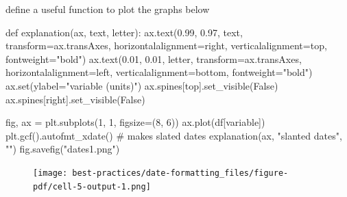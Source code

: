 \documentclass[
  letterpaper,
  DIV=11,
  numbers=noendperiod,
  oneside]{scrreprt}
\newenvironment{Shaded}{\begin{snugshade}}{\end{snugshade}}
\newcommand{\BuiltInTok}[1]{\textcolor[rgb]{0.00,0.23,0.31}{#1}}
\newcommand{\CommentTok}[1]{\textcolor[rgb]{0.37,0.37,0.37}{#1}}
\newcommand{\DecValTok}[1]{\textcolor[rgb]{0.68,0.00,0.00}{#1}}
\newcommand{\FloatTok}[1]{\textcolor[rgb]{0.68,0.00,0.00}{#1}}
\newcommand{\KeywordTok}[1]{\textcolor[rgb]{0.00,0.23,0.31}{#1}}
\newcommand{\NormalTok}[1]{\textcolor[rgb]{0.00,0.23,0.31}{#1}}
\newcommand{\OperatorTok}[1]{\textcolor[rgb]{0.37,0.37,0.37}{#1}}
\newcommand{\StringTok}[1]{\textcolor[rgb]{0.13,0.47,0.30}{#1}}
\newcommand{\VariableTok}[1]{\textcolor[rgb]{0.07,0.07,0.07}{#1}}
\begin{document}
define a useful function to plot the graphs below

\begin{Shaded}
\begin{Highlighting}[]
\KeywordTok{def}\NormalTok{ explanation(ax, text, letter):}
\NormalTok{    ax.text(}\FloatTok{0.99}\NormalTok{, }\FloatTok{0.97}\NormalTok{, text,}
\NormalTok{            transform}\OperatorTok{=}\NormalTok{ax.transAxes,}
\NormalTok{            horizontalalignment}\OperatorTok{=}\StringTok{\textquotesingle{}right\textquotesingle{}}\NormalTok{, verticalalignment}\OperatorTok{=}\StringTok{\textquotesingle{}top\textquotesingle{}}\NormalTok{,}
\NormalTok{            fontweight}\OperatorTok{=}\StringTok{"bold"}\NormalTok{)}
\NormalTok{    ax.text(}\FloatTok{0.01}\NormalTok{, }\FloatTok{0.01}\NormalTok{, letter,}
\NormalTok{            transform}\OperatorTok{=}\NormalTok{ax.transAxes,}
\NormalTok{            horizontalalignment}\OperatorTok{=}\StringTok{\textquotesingle{}left\textquotesingle{}}\NormalTok{, verticalalignment}\OperatorTok{=}\StringTok{\textquotesingle{}bottom\textquotesingle{}}\NormalTok{,}
\NormalTok{            fontweight}\OperatorTok{=}\StringTok{"bold"}\NormalTok{)}
\NormalTok{    ax.}\BuiltInTok{set}\NormalTok{(ylabel}\OperatorTok{=}\StringTok{"variable (units)"}\NormalTok{)}
\NormalTok{    ax.spines[}\StringTok{\textquotesingle{}top\textquotesingle{}}\NormalTok{].set\_visible(}\VariableTok{False}\NormalTok{)}
\NormalTok{    ax.spines[}\StringTok{\textquotesingle{}right\textquotesingle{}}\NormalTok{].set\_visible(}\VariableTok{False}\NormalTok{)}
\end{Highlighting}
\end{Shaded}

\begin{Shaded}
\begin{Highlighting}[]
\NormalTok{fig, ax }\OperatorTok{=}\NormalTok{ plt.subplots(}\DecValTok{1}\NormalTok{, }\DecValTok{1}\NormalTok{, figsize}\OperatorTok{=}\NormalTok{(}\DecValTok{8}\NormalTok{, }\DecValTok{6}\NormalTok{))}
\NormalTok{ax.plot(df[}\StringTok{\textquotesingle{}variable\textquotesingle{}}\NormalTok{])}
\NormalTok{plt.gcf().autofmt\_xdate()  }\CommentTok{\# makes slated dates}
\NormalTok{explanation(ax, }\StringTok{"slanted dates"}\NormalTok{, }\StringTok{""}\NormalTok{)}
\NormalTok{fig.savefig(}\StringTok{"dates1.png"}\NormalTok{)}
\end{Highlighting}
\end{Shaded}

\begin{figure}[H]

{\centering \texttt{[image: best-practices/date-formatting\_files/figure-pdf/cell-5-output-1.png]}

}

\end{figure}
\end{document}

